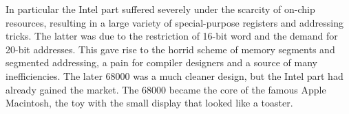 In particular the Intel part suffered severely under the scarcity of on-chip resources,
resulting in a large variety of special-purpose registers and addressing tricks. The
latter was due to the restriction of 16-bit word and the demand for 20-bit
addresses. This gave rise to the horrid scheme of memory segments and
segmented addressing, a pain for compiler designers and a source of many
inefficiencies. The later 68000 was a much cleaner design, but the Intel part had
already gained the market. The 68000 became the core of the famous Apple
Macintosh, the toy with the small display that looked like a toaster.

